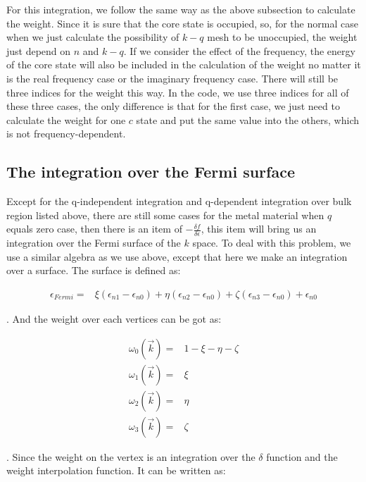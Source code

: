 \documentclass[10pt]{article}
\begin{document}
For this integration, we follow the same way as the above subsection to calculate the weight. Since it is sure that the core state is occupied, so, for the normal case when we just calculate the possibility of $k-q$ mesh to be unoccupied, the weight just depend on $n$ and $k-q$. If we consider the effect of the frequency, the energy of the core state will also be included in the calculation of the weight no matter it is the real frequency case or the imaginary frequency case. There will still be three indices for the weight this way. In the code, we use three indices for all of these three cases, the only difference is that for the first case, we just need to calculate the weight for one $c$ state and put the same value into the others, which is not frequency-dependent. \\

\subsection{The integration over the Fermi surface}

Except for the q-independent integration and q-dependent integration over bulk region listed above, there are 
still some cases for the metal material when $q$ equals zero case, then there is 
an item of $-\frac{\delta{f}}{\delta{\epsilon}}$, this item will bring us an integration
over the Fermi surface of the $k$ space. To deal with this problem, we use a similar algebra as 
we use above, except that here we make an integration over a surface. The surface is defined as:

\begin{eqnarray}\label{fermisurf}
\epsilon_{Fermi}=&\xi(\epsilon_{n1}-\epsilon_{n0})+\eta(\epsilon_{n2}-\epsilon_{n0})
+\zeta(\epsilon_{n3}-\epsilon_{n0})+\epsilon_{n0}
\end{eqnarray}

. And the weight over each vertices can be got as:

\begin{eqnarray}\label{weightvert}
\omega_0(\vec{k})=&1-\xi-\eta-\zeta \nonumber \\
 \omega_1(\vec{k})=&\xi    \nonumber \\
 \omega_2(\vec{k})=&\eta   \nonumber \\
 \omega_3(\vec{k})=&\zeta
\end{eqnarray}

. Since the weight on the vertex is an integration over the $\delta$ function 
and the weight interpolation function. It can be written as:
\end{document}
